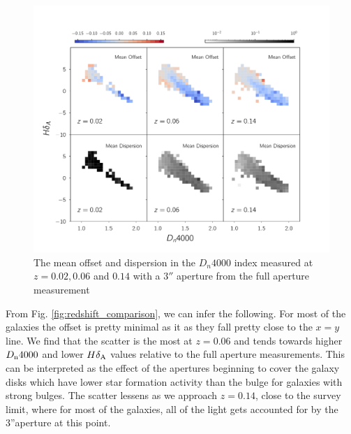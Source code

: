 \begin{figure}
\includegraphics[width=\textwidth]{figures/dn4000_full_aperture_comparisons.pdf}
\caption[The mean offset and dispersion in the $D_{n}4000$ index measured at $z = 0.02,0.06$ and $0.14$ with a $3''$ aperture from the full aperture measurement]{ The mean offset and dispersion in the $D_{n}4000$ index measured at $z = 0.02,0.06$ and $0.14$ with a $3''$ aperture from the full aperture measurement
\label{fig:offset_d4000}}
\end{figure}

From Fig. \ref{fig:redshift_comparison}, we can infer the following. For most of the galaxies the offset is pretty minimal as it as they fall pretty close to the $x=y$ line. We find that the scatter is the most at $z = 0.06$ and tends towards higher $D_{\rm n}4000$ and lower $H\delta_{\rm A}$ values relative to the full aperture measurements. This can be interpreted as the effect of the apertures beginning to cover the galaxy disks which have lower star formation activity than the bulge for galaxies with strong bulges. The scatter lessens as we approach $z = 0.14$, close to the survey limit, where for most of the galaxies, all of the light gets accounted for by the 3''aperture at this point.\\

